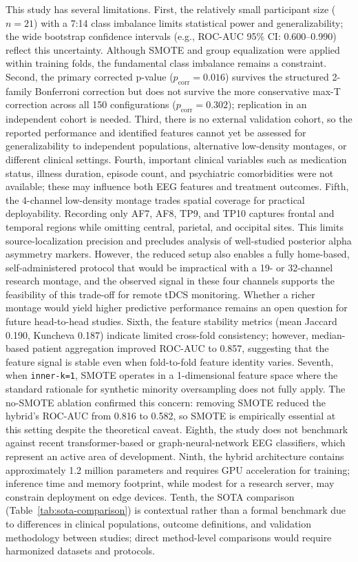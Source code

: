 This study has several limitations. First, the relatively small participant size ($n=21$) with a 7:14 class imbalance limits statistical power and generalizability; the wide bootstrap confidence intervals (e.g., ROC-AUC 95\% CI: 0.600--0.990) reflect this uncertainty. Although SMOTE and group equalization were applied within training folds, the fundamental class imbalance remains a constraint. Second, the primary corrected p-value ($p_\text{corr}=0.016$) survives the structured 2-family Bonferroni correction but does not survive the more conservative max-T correction across all 150 configurations ($p_\text{corr}=0.302$); replication in an independent cohort is needed. Third, there is no external validation cohort, so the reported performance and identified features cannot yet be assessed for generalizability to independent populations, alternative low-density montages, or different clinical settings. Fourth, important clinical variables such as medication status, illness duration, episode count, and psychiatric comorbidities were not available; these may influence both EEG features and treatment outcomes. Fifth, the 4-channel low-density montage trades spatial coverage for practical deployability. Recording only AF7, AF8, TP9, and TP10 captures frontal and temporal regions while omitting central, parietal, and occipital sites. This limits source-localization precision and precludes analysis of well-studied posterior alpha asymmetry markers. However, the reduced setup also enables a fully home-based, self-administered protocol that would be impractical with a 19- or 32-channel research montage, and the observed signal in these four channels supports the feasibility of this trade-off for remote tDCS monitoring. Whether a richer montage would yield higher predictive performance remains an open question for future head-to-head studies. Sixth, the feature stability metrics (mean Jaccard 0.190, Kuncheva 0.187) indicate limited cross-fold consistency; however, median-based patient aggregation improved ROC-AUC to 0.857, suggesting that the feature signal is stable even when fold-to-fold feature identity varies. Seventh, when \texttt{inner-k=1}, SMOTE operates in a 1-dimensional feature space where the standard rationale for synthetic minority oversampling does not fully apply. The no-SMOTE ablation confirmed this concern: removing SMOTE reduced the hybrid's ROC-AUC from 0.816 to 0.582, so SMOTE is empirically essential at this setting despite the theoretical caveat. Eighth, the study does not benchmark against recent transformer-based or graph-neural-network EEG classifiers, which represent an active area of development. Ninth, the hybrid architecture contains approximately 1.2 million parameters and requires GPU acceleration for training; inference time and memory footprint, while modest for a research server, may constrain deployment on edge devices. Tenth, the SOTA comparison (Table~\ref{tab:sota-comparison}) is contextual rather than a formal benchmark due to differences in clinical populations, outcome definitions, and validation methodology between studies; direct method-level comparisons would require harmonized datasets and protocols.

